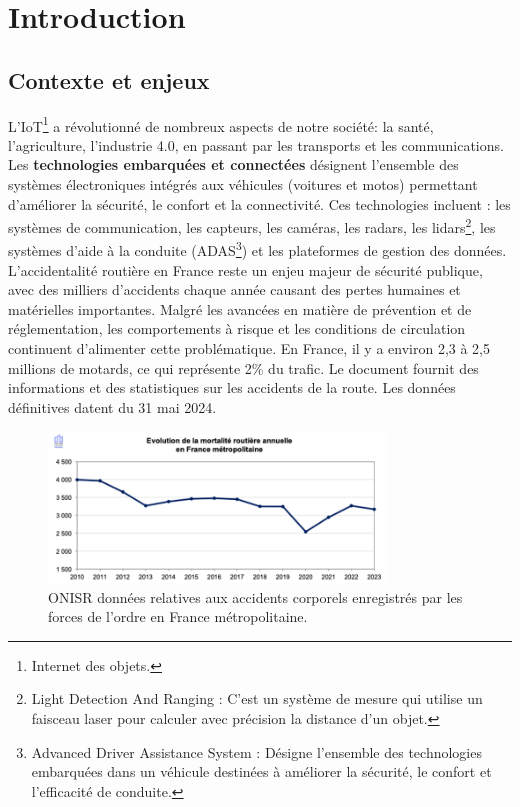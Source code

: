 \section{Introduction}
\subsection{Contexte et enjeux}
L'IoT\footnote{Internet des objets.} a révolutionné de nombreux aspects de notre société: la santé, l'agriculture, l'industrie 4.0, en passant par les transports et les communications.
Les \textbf{technologies embarquées et connectées} désignent l’ensemble des systèmes électroniques intégrés aux véhicules (voitures et motos) permettant d’améliorer la sécurité, le confort et la connectivité. Ces technologies incluent : les systèmes de communication, les capteurs, les caméras, les radars, les lidars\footnote{Light Detection And Ranging : C'est un système de mesure qui utilise un faisceau laser pour calculer avec précision la distance d’un objet.}, les systèmes d’aide à la conduite (ADAS\footnote{Advanced Driver Assistance System : Désigne l’ensemble des technologies embarquées dans un véhicule destinées à améliorer la sécurité, le confort et l’efficacité de conduite. }) et les plateformes de gestion des données.\\
L’accidentalité routière en France reste un enjeu majeur de sécurité publique, avec des milliers d’accidents chaque année causant des pertes humaines et matérielles importantes. Malgré les avancées en matière de prévention et de réglementation, les comportements à risque et les conditions de circulation continuent d’alimenter cette problématique.
En France, il y a environ 2,3 à 2,5 millions de motards\cite{actiEouteNbMotardFr}, ce qui représente 2\%  du trafic.
Le document\cite{la_securite_routiere_accidentalite_2024} fournit des informations et des statistiques sur les accidents de la route. Les données définitives datent du 31 mai 2024.

\begin{figure}[h]
    \centering
    \includegraphics[width=0.8\textwidth]{images/evolution_mortalite_securite_routiere_france.png} 
    \caption{ONISR données relatives aux accidents corporels enregistrés par les forces de l'ordre en France métropolitaine.}
\end{figure}

